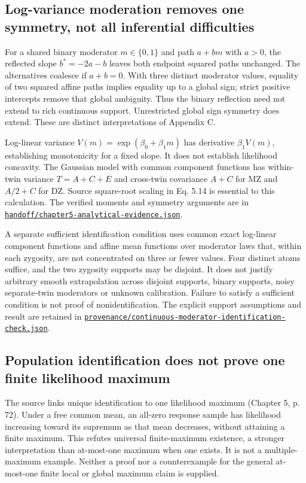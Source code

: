 \documentclass[11pt]{article}
\newcommand{\file}[1]{\href{https://github.com/alectionary/vibe-math/blob/master/formalization/schwabe-psychometric-genetics/#1}{\nolinkurl{#1}}}
\begin{document}
\subsection{Log-variance moderation removes one symmetry, not all inferential difficulties}
For a shared binary moderator $m\in\{0,1\}$ and path $a+bm$ with $a>0$, the reflected slope $b^*=-2a-b$ leaves both endpoint squared paths unchanged. The alternatives coalesce if $a+b=0$. With three distinct moderator values, equality of two squared affine paths implies equality up to a global sign; strict positive intercepts remove that global ambiguity. Thus the binary reflection need not extend to rich continuous support. Unrestricted global sign symmetry does extend. These are distinct interpretations of Appendix C.

Log-linear variance $V(m)=\exp(\beta_0+\beta_1m)$ has derivative $\beta_1V(m)$, establishing monotonicity for a fixed slope. It does not establish likelihood concavity. The Gaussian model with common component functions has within-twin variance $T=A+C+E$ and cross-twin covariance $A+C$ for MZ and $A/2+C$ for DZ. Source square-root scaling in Eq. 5.14 is essential to this calculation. The verified moments and symmetry arguments are in \file{handoff/chapter5-analytical-evidence.json}.

A separate sufficient identification condition uses common exact log-linear component functions and affine mean functions over moderator laws that, within each zygosity, are not concentrated on three or fewer values. Four distinct atoms suffice, and the two zygosity supports may be disjoint. It does not justify arbitrary smooth extrapolation across disjoint supports, binary supports, noisy separate-twin moderators or unknown calibration. Failure to satisfy a sufficient condition is not proof of nonidentification. The explicit support assumptions and result are retained in \file{provenance/continuous-moderator-identification-check.json}.

\subsection{Population identification does not prove one finite likelihood maximum}
The source links unique identification to one likelihood maximum (Chapter 5, p. 72). Under a free common mean, an all-zero response sample has likelihood increasing toward its supremum as that mean decreases, without attaining a finite maximum. This refutes universal finite-maximum existence, a stronger interpretation than at-most-one maximum when one exists. It is not a multiple-maximum example. Neither a proof nor a counterexample for the general at-most-one finite local or global maximum claim is supplied.
\end{document}
